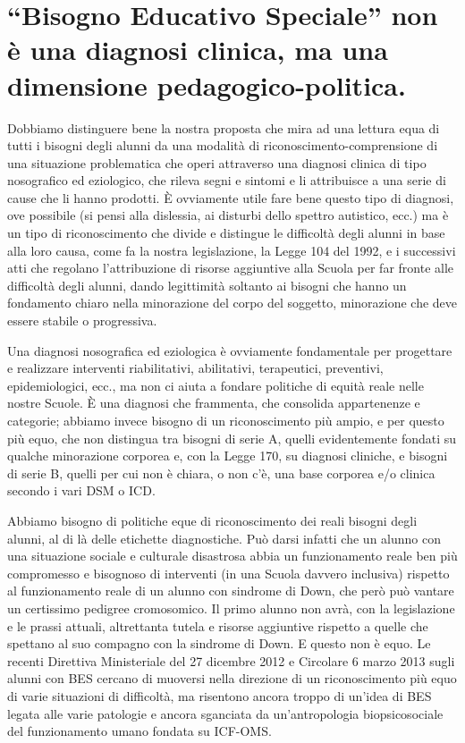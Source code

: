 \section*{“Bisogno Educativo Speciale” non è una diagnosi clinica, ma una dimensione pedagogico-politica.}
Dobbiamo distinguere bene la nostra proposta che mira ad una lettura equa di tutti i bisogni
degli alunni da una modalità di riconoscimento-comprensione di una situazione problematica che
operi attraverso una diagnosi clinica di tipo nosografico ed eziologico, che rileva segni e sintomi e li
attribuisce a una serie di cause che li hanno prodotti. È ovviamente utile fare bene questo tipo di
diagnosi, ove possibile (si pensi alla dislessia, ai disturbi dello spettro autistico, ecc.) ma è un tipo
di riconoscimento che divide e distingue le difficoltà degli alunni in base alla loro causa, come fa la
nostra legislazione, la Legge 104 del 1992, e i successivi atti che regolano l'attribuzione di risorse
aggiuntive alla Scuola per far fronte alle difficoltà degli alunni, dando legittimità soltanto ai bisogni
che hanno un fondamento chiaro nella minorazione del corpo del soggetto, minorazione che deve
essere stabile o progressiva.

Una diagnosi nosografica ed eziologica è ovviamente fondamentale per progettare e realizzare
interventi riabilitativi, abilitativi, terapeutici, preventivi, epidemiologici, ecc., ma non ci aiuta a
fondare politiche di equità reale nelle nostre Scuole. È una diagnosi che frammenta, che consolida
appartenenze e categorie; abbiamo invece bisogno di un riconoscimento più ampio, e per questo
più equo, che non distingua tra bisogni di serie A, quelli evidentemente fondati su qualche
minorazione corporea e, con la Legge 170, su diagnosi cliniche, e bisogni di serie B, quelli per cui
non è chiara, o non c'è, una base corporea e/o clinica secondo i vari DSM o ICD.

Abbiamo bisogno di politiche eque di riconoscimento dei reali bisogni degli alunni, al di là
delle etichette diagnostiche. Può darsi infatti che un alunno con una situazione sociale e culturale
disastrosa abbia un funzionamento reale ben più compromesso e bisognoso di interventi (in una
Scuola davvero inclusiva) rispetto al funzionamento reale di un alunno con sindrome di Down, che
però può vantare un certissimo pedigree cromosomico. Il primo alunno non avrà, con la
legislazione e le prassi attuali, altrettanta tutela e risorse aggiuntive rispetto a quelle che spettano
al suo compagno con la sindrome di Down. E questo non è equo. Le recenti Direttiva Ministeriale
del 27 dicembre 2012 e Circolare 6 marzo 2013 sugli alunni con BES cercano di muoversi nella
direzione di un riconoscimento più equo di varie situazioni di difficoltà, ma risentono ancora
troppo di un'idea di BES legata alle varie patologie e ancora sganciata da un'antropologia
biopsicosociale del funzionamento umano fondata su ICF-OMS.

